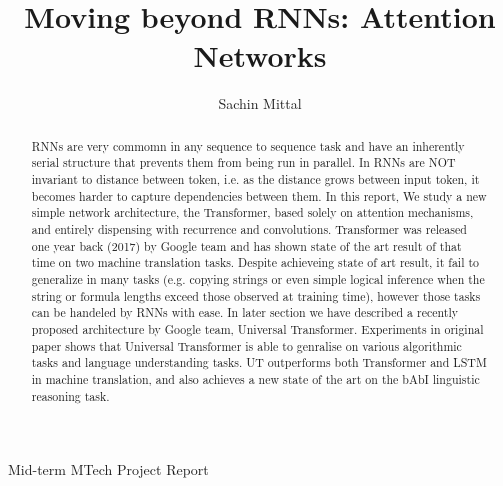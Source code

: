 \documentclass{article}
\title{\large \bf Moving beyond RNNs: Attention Networks }
\author{Sachin Mittal}
\date{}
\begin{document}
	\maketitle
    \begin{center}
        Mid-term MTech Project Report
    \end{center}
        \vskip 12pt
	\thispagestyle{empty}
	
	
		\begin{abstract}
		RNNs are very commomn in any sequence to sequence task and have an inherently serial structure that prevents them from being run in parallel. In RNNs are NOT invariant to distance between token, i.e. as the distance grows between input token, it becomes harder to capture dependencies between them. In this report, We study a new simple network architecture, the Transformer, based solely on attention mechanisms, and entirely  dispensing with recurrence and convolutions. Transformer \cite{DBLP:journals/corr/VaswaniSPUJGKP17} was released one year back (2017) by Google team and has shown state of the art result of that time on two machine translation tasks. Despite achieveing state of art result, it fail to generalize in many tasks (e.g. copying strings or even simple logical inference when the string or formula lengths exceed those observed at training time), however those tasks can be handeled by RNNs with ease. 
		 In later section we have described a recently proposed architecture by Google team, Universal Transformer\cite{dehghani2018universal}. Experiments in original paper shows that  Universal Transformer is able to genralise on various algorithmic tasks and language understanding tasks. UT outperforms both Transformer and LSTM in machine translation, and also achieves a new state of the art on the bAbI linguistic reasoning task\cite{weston2015aicomplete}.
	\end{abstract}	
	
	\hfill \\
	
\end{document}
